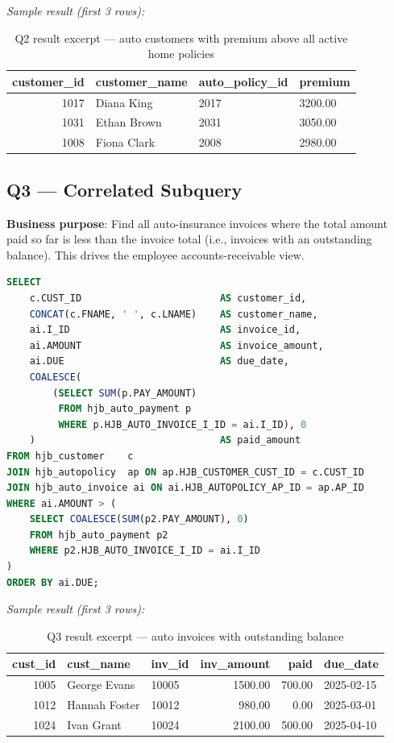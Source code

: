 \documentclass[12pt,letterpaper]{article}
\begin{document}
\textit{Sample result (first 3 rows):}
\begin{table}[H]
\centering\small
\begin{tabular}{rlll}
\toprule
\textbf{customer\_id} & \textbf{customer\_name} & \textbf{auto\_policy\_id} & \textbf{premium} \\
\midrule
1017 & Diana King    & 2017 & 3200.00 \\
1031 & Ethan Brown   & 2031 & 3050.00 \\
1008 & Fiona Clark   & 2008 & 2980.00 \\
\bottomrule
\end{tabular}
\caption{Q2 result excerpt --- auto customers with premium above all active home policies}
\end{table}

\subsection{Q3 --- Correlated Subquery}

\textbf{Business purpose}: Find all auto-insurance invoices where the total amount paid so far is less than the invoice total (i.e., invoices with an outstanding balance). This drives the employee accounts-receivable view.

\begin{lstlisting}[language=SQL,caption={Q3: Correlated subquery to detect unpaid invoices}]
SELECT
    c.CUST_ID                        AS customer_id,
    CONCAT(c.FNAME, ' ', c.LNAME)    AS customer_name,
    ai.I_ID                          AS invoice_id,
    ai.AMOUNT                        AS invoice_amount,
    ai.DUE                           AS due_date,
    COALESCE(
        (SELECT SUM(p.PAY_AMOUNT)
         FROM hjb_auto_payment p
         WHERE p.HJB_AUTO_INVOICE_I_ID = ai.I_ID), 0
    )                                AS paid_amount
FROM hjb_customer    c
JOIN hjb_autopolicy  ap ON ap.HJB_CUSTOMER_CUST_ID = c.CUST_ID
JOIN hjb_auto_invoice ai ON ai.HJB_AUTOPOLICY_AP_ID = ap.AP_ID
WHERE ai.AMOUNT > (
    SELECT COALESCE(SUM(p2.PAY_AMOUNT), 0)
    FROM hjb_auto_payment p2
    WHERE p2.HJB_AUTO_INVOICE_I_ID = ai.I_ID
)
ORDER BY ai.DUE;
\end{lstlisting}

\textit{Sample result (first 3 rows):}
\begin{table}[H]
\centering\small
\begin{tabular}{rllrrl}
\toprule
\textbf{cust\_id} & \textbf{cust\_name} & \textbf{inv\_id} & \textbf{inv\_amount} & \textbf{paid} & \textbf{due\_date} \\
\midrule
1005 & George Evans  & 10005 & 1500.00 & 700.00 & 2025-02-15 \\
1012 & Hannah Foster & 10012 & 980.00  & 0.00   & 2025-03-01 \\
1024 & Ivan Grant    & 10024 & 2100.00 & 500.00 & 2025-04-10 \\
\bottomrule
\end{tabular}
\caption{Q3 result excerpt --- auto invoices with outstanding balance}
\end{table}
\end{document}
